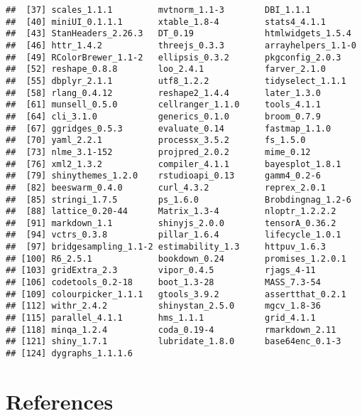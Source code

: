 \documentclass[
  11pt,
  english,
  ,doc,mask,floatsintext]{apa6}
\begin{document}
\begin{verbatim}
##  [37] scales_1.1.1         mvtnorm_1.1-3        DBI_1.1.1           
##  [40] miniUI_0.1.1.1       xtable_1.8-4         stats4_4.1.1        
##  [43] StanHeaders_2.26.3   DT_0.19              htmlwidgets_1.5.4   
##  [46] httr_1.4.2           threejs_0.3.3        arrayhelpers_1.1-0  
##  [49] RColorBrewer_1.1-2   ellipsis_0.3.2       pkgconfig_2.0.3     
##  [52] reshape_0.8.8        loo_2.4.1            farver_2.1.0        
##  [55] dbplyr_2.1.1         utf8_1.2.2           tidyselect_1.1.1    
##  [58] rlang_0.4.12         reshape2_1.4.4       later_1.3.0         
##  [61] munsell_0.5.0        cellranger_1.1.0     tools_4.1.1         
##  [64] cli_3.1.0            generics_0.1.0       broom_0.7.9         
##  [67] ggridges_0.5.3       evaluate_0.14        fastmap_1.1.0       
##  [70] yaml_2.2.1           processx_3.5.2       fs_1.5.0            
##  [73] nlme_3.1-152         projpred_2.0.2       mime_0.12           
##  [76] xml2_1.3.2           compiler_4.1.1       bayesplot_1.8.1     
##  [79] shinythemes_1.2.0    rstudioapi_0.13      gamm4_0.2-6         
##  [82] beeswarm_0.4.0       curl_4.3.2           reprex_2.0.1        
##  [85] stringi_1.7.5        ps_1.6.0             Brobdingnag_1.2-6   
##  [88] lattice_0.20-44      Matrix_1.3-4         nloptr_1.2.2.2      
##  [91] markdown_1.1         shinyjs_2.0.0        tensorA_0.36.2      
##  [94] vctrs_0.3.8          pillar_1.6.4         lifecycle_1.0.1     
##  [97] bridgesampling_1.1-2 estimability_1.3     httpuv_1.6.3        
## [100] R6_2.5.1             bookdown_0.24        promises_1.2.0.1    
## [103] gridExtra_2.3        vipor_0.4.5          rjags_4-11          
## [106] codetools_0.2-18     boot_1.3-28          MASS_7.3-54         
## [109] colourpicker_1.1.1   gtools_3.9.2         assertthat_0.2.1    
## [112] withr_2.4.2          shinystan_2.5.0      mgcv_1.8-36         
## [115] parallel_4.1.1       hms_1.1.1            grid_4.1.1          
## [118] minqa_1.2.4          coda_0.19-4          rmarkdown_2.11      
## [121] shiny_1.7.1          lubridate_1.8.0      base64enc_0.1-3     
## [124] dygraphs_1.1.1.6
\end{verbatim}

\newpage

\hypertarget{references}{%
\section*{References}\label{references}}
\end{document}
